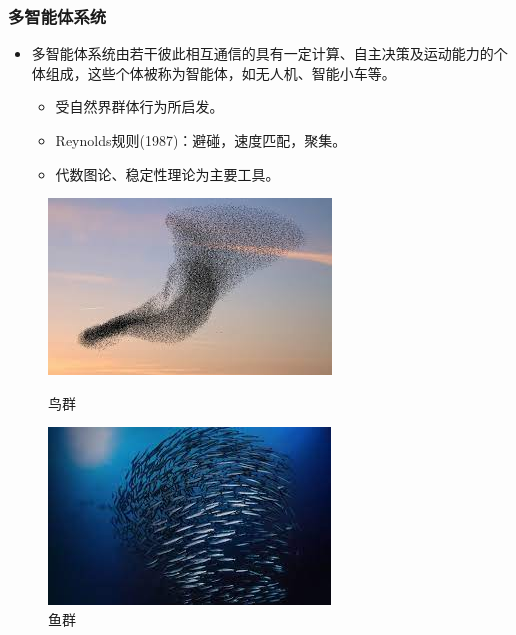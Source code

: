\documentclass{beamer}
\theoremstyle{remark}
\begin{document}
\begin{frame}
	\frametitle{多智能体系统}
	\begin{itemize}
		\item 多智能体系统由若干彼此相互通信的具有一定计算、自主决策及运动能力的个体组成，这些个体被称为智能体，如无人机、智能小车等。
			\begin{itemize}
				\item 受自然界群体行为所启发。
				\item Reynolds规则(1987)：避碰，速度匹配，聚集。
				\item 代数图论、稳定性理论为主要工具。
			\end{itemize}
	\end{itemize}
	\begin{figure}[htbp]
		\centering
		\begin{minipage}[c]{0.5\textwidth} 
				\centering
				\includegraphics[width=0.8\linewidth]{Fig/f1.jpeg}
				\caption{鸟群}
		\end{minipage}%
		\begin{minipage}[c]{0.5\textwidth}
				\centering
				\includegraphics[width=0.8\linewidth]{Fig/f2.jpeg}
				\caption{\label{}鱼群}
		\end{minipage}
	\end{figure}		
\end{frame}
\end{document}
